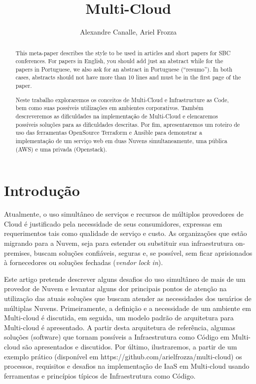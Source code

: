 \documentclass[12pt]{article}
\title{Multi-Cloud}
\author{Alexandre Canalle\inst{1}, Ariel Frozza\inst{1}}
\begin{document}
\sloppy
\maketitle
	
\begin{abstract}
	This meta-paper describes the style to be used in articles and short papers
	for SBC conferences. For papers in English, you should add just an abstract
	while for the papers in Portuguese, we also ask for an abstract in
	Portuguese (``resumo''). In both cases, abstracts should not have more than
	10 lines and must be in the first page of the paper.
\end{abstract}

\begin{abstract} 
	Neste trabalho exploraremos os conceitos de Multi-Cloud e Infrastructure as Code, bem como suas possíveis utilizações em ambientes corporativos. Também descreveremos as dificuldades na implementação de Multi-Cloud e elencaremos possíveis soluções para as dificuldades descritas.  Por fim, apresentaremos um roteiro de uso das ferramentas OpenSource Terraform e Ansible para demonstrar a implementação de um serviço web em duas Nuvens simultaneamente, uma pública (AWS) e uma privada (Openstack).
\end{abstract}

	\section{Introdução}
	    Atualmente, o uso simultâneo de serviços e recursos de múltiplos provedores de Cloud é justificado pela necessidade de seus consumidores, expressas em requerimentos tais como qualidade de serviço e custo. As organizações que estão migrando para a Nuvem, seja para estender ou substituir sua infraestrutura on-premises, buscam soluções confiáveis, seguras e, se possível, sem ficar aprisionados à fornecedores ou soluções fechadas (\textit{vendor lock in}).
	    
	    Este artigo pretende descrever alguns desafios do uso simultâneo de mais de um provedor de Nuvem e levantar alguns dor principais pontos de atenção na utilização das atuais soluções que buscam atender as necessidades dos usuários de múltiplas Nuvens. Primeiramente, a definição e a necessidade de um ambiente em Multi-cloud é discutida, em seguida, um modelo padrão de arquitetura para Multi-cloud é apresentado. A partir desta arquitetura de referência, algumas soluções (software) que tornam possíveis a Infraestrutura como Código em Multi-cloud são apresentados e discutidos. Por último, ilustraremos, a partir de um exemplo prático (disponível em https://github.com/arielfrozza/multi-cloud) os processos, requisitos e desafios na implementação de IaaS em Multi-cloud usando ferramentas e princípios típicos de Infraestrutura como Código.
	    
\end{document}
